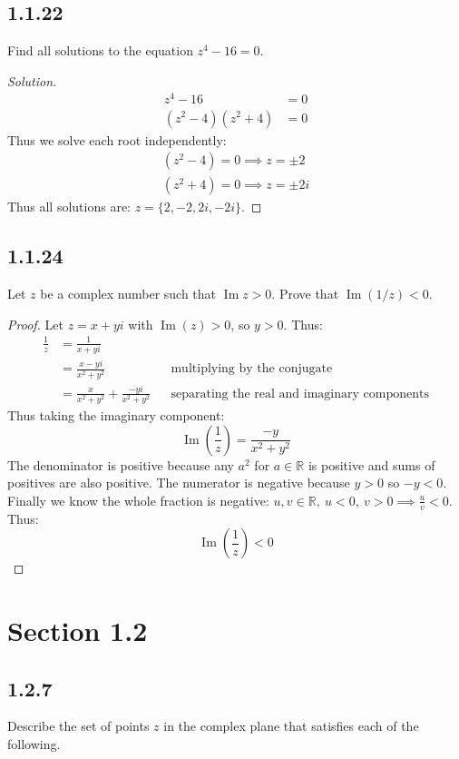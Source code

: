 \documentclass{article}
\newenvironment{solution}{
\begin{proof}[Solution]}{
\end{proof}}
\begin{document}
\subsection*{1.1.22}
Find all solutions to the equation $z^4 - 16 = 0$.
\begin{solution}
  \begin{align*}
    z^4 - 16 &= 0 \\
    (z^2-4)(z^2+4) &= 0
  \end{align*}
  Thus we solve each root independently:
  \begin{gather*}
    (z^2-4) = 0 \implies z = \pm 2 \\
    (z^2+4) = 0 \implies z = \pm 2i
  \end{gather*}
  Thus all solutions are: $z = \{2, -2, 2i, -2i\}$.
\end{solution}

\subsection*{1.1.24}
Let $z$ be a complex number such that $\operatorname{Im} z > 0$. Prove that $\operatorname{Im}(1/z) < 0$.
\begin{proof}
  Let $z = x + yi$ with $\operatorname{Im}(z) > 0$, so $y > 0$. Thus:
  \begin{align*}
    \frac{1}{z} &= \frac{1}{x+yi} \\
      &= \frac{x-yi}{x^2+y^2} && \text{multiplying by the conjugate} \\
      &= \frac{x}{x^2+y^2} + \frac{-yi}{x^2+y^2} && \text{separating the real and imaginary components}
  \end{align*}
  Thus taking the imaginary component:
  \[
    \operatorname{Im}\left(\frac{1}{z}\right) = \frac{-y}{x^2+y^2}
  \]
  The denominator is positive because any $a^2$ for $a \in \mathbb{R}$ is positive and sums of positives are also positive.
  The numerator is negative because $y > 0$ so $-y < 0$.
  Finally we know the whole fraction is negative: $u, v \in \mathbb{R},\ u < 0,\ v > 0 \implies \frac{u}{v} < 0$.
  Thus:
  \[
    \operatorname{Im}\left(\frac{1}{z}\right) < 0
  \]
\end{proof}

\section*{Section 1.2}

\subsection*{1.2.7}
Describe the set of points $z$ in the complex plane that satisfies each of the following.
\end{document}
